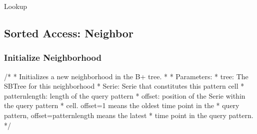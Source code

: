 \documentclass[abstracton,12pt]{scrreprt}
\begin{document}
\begin{algorithm}[H]
	\IncMargin{1em}
	\SetAlgoLined
	\DontPrintSemicolon
	
	
	

	\caption{Lookup}	\label{Lookup}
\end{algorithm}

\newpage
\subsection{Sorted Access: Neighbor}

\subsubsection{Initialize Neighborhood}
/*
* Initializes a new neighborhood in the B+ tree.
*
* Parameters:
*   tree: The  SBTree for this neighborhood
*   Serie: Serie that constitutes this pattern cell
*   patternlength: length of the query pattern
*   offset: position of the Serie within the query pattern
*           cell. offset=1 means the oldest time point in the
*           query pattern, offset=patternlength means the latest
*           time point in the query pattern.
*/
\end{document}

